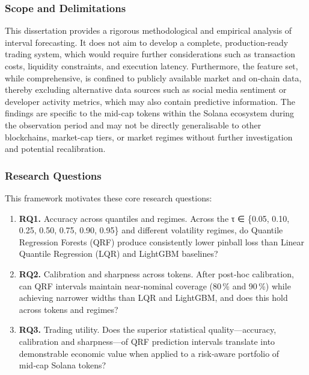 \documentclass[
  a4paper,
  DIV=11,
  numbers=noendperiod]{scrreprt}
\providecommand{\tightlist}{%
  \setlength{\itemsep}{0pt}\setlength{\parskip}{0pt}}
\begin{document}
\subsubsection{Scope and Delimitations}\label{scope-and-delimitations}

This dissertation provides a rigorous methodological and empirical
analysis of interval forecasting. It does not aim to develop a complete,
production-ready trading system, which would require further
considerations such as transaction costs, liquidity constraints, and
execution latency. Furthermore, the feature set, while comprehensive, is
confined to publicly available market and on-chain data, thereby
excluding alternative data sources such as social media sentiment or
developer activity metrics, which may also contain predictive
information. The findings are specific to the mid-cap tokens within the
Solana ecosystem during the observation period and may not be directly
generalisable to other blockchains, market-cap tiers, or market regimes
without further investigation and potential recalibration.

\subsubsection{Research Questions}\label{research-questions}

This framework motivates these core research questions:

\begin{enumerate}
\def\labelenumi{\arabic{enumi}.}
\tightlist
\item
  \textbf{RQ1.} Accuracy across quantiles and regimes. Across the τ ∈
  \{0.05, 0.10, 0.25, 0.50, 0.75, 0.90, 0.95\} and different volatility
  regimes, do Quantile Regression Forests (QRF) produce consistently
  lower pinball loss than Linear Quantile Regression (LQR) and LightGBM
  baselines?
\item
  \textbf{RQ2.} Calibration and sharpness across tokens. After post‑hoc
  calibration, can QRF intervals maintain near‑nominal coverage (80\,\%
  and 90\,\%) while achieving narrower widths than LQR and LightGBM, and
  does this hold across tokens and regimes?
\item
  \textbf{RQ3.} Trading utility. Does the superior statistical
  quality---accuracy, calibration and sharpness---of QRF prediction
  intervals translate into demonstrable economic value when applied to a
  risk‑aware portfolio of mid‑cap Solana tokens?
\end{enumerate}
\end{document}
